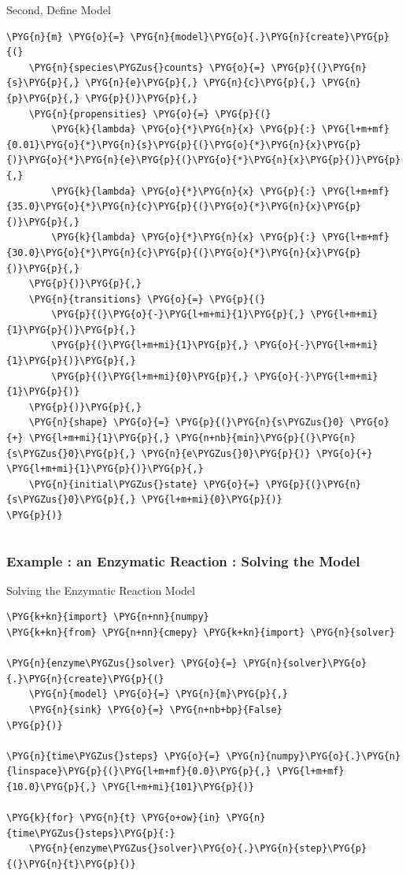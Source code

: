\documentclass[hyperref={colorlinks=true}]{beamer}
\begin{document}
\begin{frame}[fragile]
\begin{columns}[t]
\begin{block}{Second, Define Model}
\begin{Verbatim}[commandchars=\\\{\}, fontsize=\tiny]
\PYG{n}{m} \PYG{o}{=} \PYG{n}{model}\PYG{o}{.}\PYG{n}{create}\PYG{p}{(}
    \PYG{n}{species\PYGZus{}counts} \PYG{o}{=} \PYG{p}{(}\PYG{n}{s}\PYG{p}{,} \PYG{n}{e}\PYG{p}{,} \PYG{n}{c}\PYG{p}{,} \PYG{n}{p}\PYG{p}{,} \PYG{p}{)}\PYG{p}{,}
    \PYG{n}{propensities} \PYG{o}{=} \PYG{p}{(}
        \PYG{k}{lambda} \PYG{o}{*}\PYG{n}{x} \PYG{p}{:} \PYG{l+m+mf}{0.01}\PYG{o}{*}\PYG{n}{s}\PYG{p}{(}\PYG{o}{*}\PYG{n}{x}\PYG{p}{)}\PYG{o}{*}\PYG{n}{e}\PYG{p}{(}\PYG{o}{*}\PYG{n}{x}\PYG{p}{)}\PYG{p}{,}
        \PYG{k}{lambda} \PYG{o}{*}\PYG{n}{x} \PYG{p}{:} \PYG{l+m+mf}{35.0}\PYG{o}{*}\PYG{n}{c}\PYG{p}{(}\PYG{o}{*}\PYG{n}{x}\PYG{p}{)}\PYG{p}{,}
        \PYG{k}{lambda} \PYG{o}{*}\PYG{n}{x} \PYG{p}{:} \PYG{l+m+mf}{30.0}\PYG{o}{*}\PYG{n}{c}\PYG{p}{(}\PYG{o}{*}\PYG{n}{x}\PYG{p}{)}\PYG{p}{,}
    \PYG{p}{)}\PYG{p}{,}
    \PYG{n}{transitions} \PYG{o}{=} \PYG{p}{(}
        \PYG{p}{(}\PYG{o}{-}\PYG{l+m+mi}{1}\PYG{p}{,} \PYG{l+m+mi}{1}\PYG{p}{)}\PYG{p}{,}
        \PYG{p}{(}\PYG{l+m+mi}{1}\PYG{p}{,} \PYG{o}{-}\PYG{l+m+mi}{1}\PYG{p}{)}\PYG{p}{,}
        \PYG{p}{(}\PYG{l+m+mi}{0}\PYG{p}{,} \PYG{o}{-}\PYG{l+m+mi}{1}\PYG{p}{)}
    \PYG{p}{)}\PYG{p}{,}
    \PYG{n}{shape} \PYG{o}{=} \PYG{p}{(}\PYG{n}{s\PYGZus{}0} \PYG{o}{+} \PYG{l+m+mi}{1}\PYG{p}{,} \PYG{n+nb}{min}\PYG{p}{(}\PYG{n}{s\PYGZus{}0}\PYG{p}{,} \PYG{n}{e\PYGZus{}0}\PYG{p}{)} \PYG{o}{+} \PYG{l+m+mi}{1}\PYG{p}{)}\PYG{p}{,}
    \PYG{n}{initial\PYGZus{}state} \PYG{o}{=} \PYG{p}{(}\PYG{n}{s\PYGZus{}0}\PYG{p}{,} \PYG{l+m+mi}{0}\PYG{p}{)}
\PYG{p}{)}
\end{Verbatim}
\end{block}
\end{columns}
\end{frame}


\begin{frame}[fragile]
\frametitle{Example : an Enzymatic Reaction : Solving the Model}
\begin{block}{Solving the Enzymatic Reaction Model}
\begin{Verbatim}[commandchars=\\\{\}]
\PYG{k+kn}{import} \PYG{n+nn}{numpy}
\PYG{k+kn}{from} \PYG{n+nn}{cmepy} \PYG{k+kn}{import} \PYG{n}{solver}

\PYG{n}{enzyme\PYGZus{}solver} \PYG{o}{=} \PYG{n}{solver}\PYG{o}{.}\PYG{n}{create}\PYG{p}{(}
    \PYG{n}{model} \PYG{o}{=} \PYG{n}{m}\PYG{p}{,}
    \PYG{n}{sink} \PYG{o}{=} \PYG{n+nb+bp}{False}
\PYG{p}{)}

\PYG{n}{time\PYGZus{}steps} \PYG{o}{=} \PYG{n}{numpy}\PYG{o}{.}\PYG{n}{linspace}\PYG{p}{(}\PYG{l+m+mf}{0.0}\PYG{p}{,} \PYG{l+m+mf}{10.0}\PYG{p}{,} \PYG{l+m+mi}{101}\PYG{p}{)}

\PYG{k}{for} \PYG{n}{t} \PYG{o+ow}{in} \PYG{n}{time\PYGZus{}steps}\PYG{p}{:}
    \PYG{n}{enzyme\PYGZus{}solver}\PYG{o}{.}\PYG{n}{step}\PYG{p}{(}\PYG{n}{t}\PYG{p}{)}
\end{Verbatim}
\end{block}
\end{frame}
\end{document}
